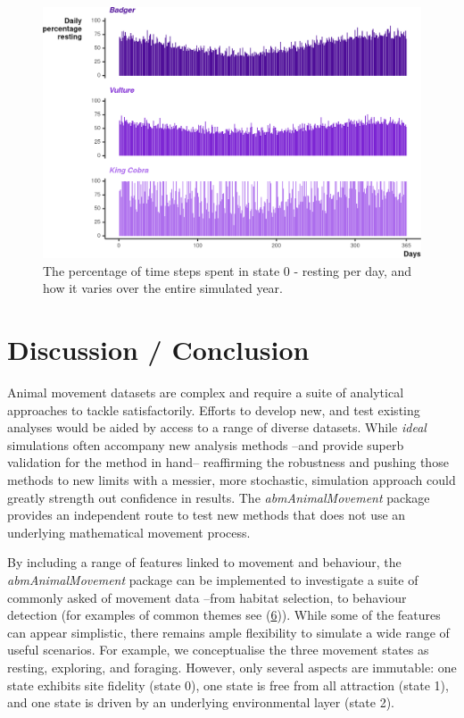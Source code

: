 \documentclass[10pt,a4paper]{article}
\begin{document}
\begin{figure}

{\centering \includegraphics{Agent-based_model_walkthrough_files/figure-latex/cycleSeasonalFigure-1} 

}

\caption{The percentage of time steps spent in state 0 - resting per day, and how it varies over the entire simulated year.}\label{fig:cycleSeasonalFigure}
\end{figure}

\hypertarget{discussion-conclusion}{%
\section{Discussion / Conclusion}\label{discussion-conclusion}}

Animal movement datasets are complex and require a suite of analytical approaches to tackle satisfactorily.
Efforts to develop new, and test existing analyses would be aided by access to a range of diverse datasets.
While \emph{ideal} simulations often accompany new analysis methods --and provide superb validation for the method in hand-- reaffirming the robustness and pushing those methods to new limits with a messier, more stochastic, simulation approach could greatly strength out confidence in results.
The \emph{abmAnimalMovement} package provides an independent route to test new methods that does not use an underlying mathematical movement process.

By including a range of features linked to movement and behaviour, the \emph{abmAnimalMovement} package can be implemented to investigate a suite of commonly asked of movement data --from habitat selection, to behaviour detection (for examples of common themes see (\protect\hyperlink{ref-joo_recent_2022}{6})).
While some of the features can appear simplistic, there remains ample flexibility to simulate a wide range of useful scenarios.
For example, we conceptualise the three movement states as resting, exploring, and foraging.
However, only several aspects are immutable: one state exhibits site fidelity (state 0), one state is free from all attraction (state 1), and one state is driven by an underlying environmental layer (state 2).
\end{document}
